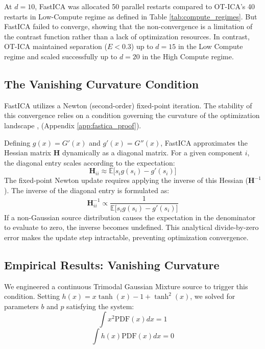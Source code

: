 \documentclass[12pt,a4paper,twoside,openany]{book}
\begin{document}
At $d=10$, FastICA was allocated 50 parallel restarts compared to OT-ICA's 40 restarts in Low-Compute regime as defined in Table \ref{tab:compute_regimes}. But FastICA failed to converge, 
showing that the non-convergence is a limitation of the contrast function rather than a lack of optimization resources. 
In contrast, OT-ICA maintained separation ($E < 0.3$) up to $d=15$ in the Low Compute regime and scaled successfully up to $d=20$ in the High Compute regime.

\subsection{The Vanishing Curvature Condition}
FastICA utilizes a Newton (second-order) fixed-point iteration. 
The stability of this convergence relies on a condition governing the curvature of the optimization landscape \cite[Chapter 8]{hyvarinen2001}, (Appendix \ref{app:fastica_proof}). 

Defining $g(x) = G'(x)$ and $g'(x) = G''(x)$, FastICA approximates the Hessian matrix $\mathbf{H}$ dynamically as a diagonal matrix. 
For a given component $i$, the diagonal entry scales according to the expectation:
\begin{equation}
    \mathbf{H}_{ii} \approx \mathbb{E}\big[s_i g(s_i) - g'(s_i)\big]
\end{equation}
The fixed-point Newton update requires applying the inverse of this Hessian ($\mathbf{H}^{-1}$). The inverse of the diagonal entry is formulated as:
\begin{equation}
    \mathbf{H}_{ii}^{-1} \propto \frac{1}{\mathbb{E}\big[s_i g(s_i) - g'(s_i)\big]}
\end{equation}
If a non-Gaussian source distribution causes the expectation in the denominator to evaluate to zero, the inverse becomes undefined. 
This analytical divide-by-zero error makes the update step intractable, preventing optimization convergence.

\subsection{Empirical Results: Vanishing Curvature}
We engineered a continuous Trimodal Gaussian Mixture source to trigger this condition. 
Setting $h(x) = x \tanh(x) - 1 + \tanh^2(x)$, we solved for parameters $b$ and $p$ satisfying the system:
\begin{equation}
    \int x^2 \text{PDF}(x) dx = 1 
\end{equation}
\begin{equation}
    \int h(x) \text{PDF}(x) dx = 0 
\end{equation}
\end{document}

